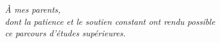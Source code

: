 
\vspace*{7cm}
\begin{center}
\noindent \textit{À mes parents,}\\[0.5em]
\textit{dont la patience et le soutien constant ont rendu possible}\\[0.3em]
\textit{ce parcours d'études supérieures.}
\end{center}

\myCleanStarChapterEnd
